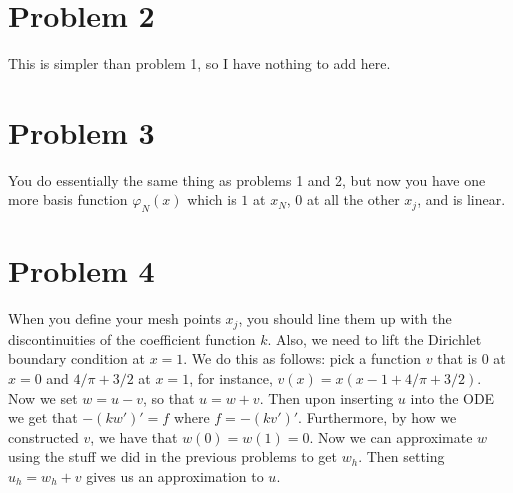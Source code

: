 \documentclass{article}
\theoremstyle{definition}
\theoremstyle{plain}
\begin{document}
\section{Problem 2}
This is simpler than problem 1, so I have nothing to add here.

\section{Problem 3}
You do essentially the same thing as problems 1 and 2, but now you have one more basis function $\varphi_N(x)$ which is $1$ at $x_N$, $0$ at all the other $x_j$, and is linear.

\section{Problem 4}
When you define your mesh points $x_j$, you should line them up with the discontinuities of the coefficient function $k$.
Also, we need to lift the Dirichlet boundary condition at $x = 1$.
We do this as follows: pick a function $v$ that is $0$ at $x = 0$ and $4/\pi + 3/2$ at $x = 1$, for instance, $v(x) = x(x - 1 + 4/\pi + 3/2)$.
Now we set $w = u - v$, so that $u = w + v$. 
Then upon inserting $u$ into the ODE we get that $-(kw')' = f$ where $f = -(kv')'$.
Furthermore, by how we constructed $v$, we have that $w(0) = w(1) = 0$.
Now we can approximate $w$ using the stuff we did in the previous problems to get $w_h$.
Then setting $u_h = w_h + v$ gives us an approximation to $u$.
\end{document}
